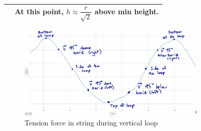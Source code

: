\documentclass[11pt, a4paper]{article}
\begin{document}
\begin{table}[H]
\begin{tabularx}{\textwidth}{|>{\raggedright\arraybackslash}X|||>{\raggedright\arraybackslash}X|}
			&
			At this point, $h\approx\dfrac{r}{\sqrt{2}}$ above min height.\\
			\hline
		\end{tabularx}
	\end{table}
	
	\begin{figure}[H]
		\centering
		\includegraphics[width=0.8\textwidth]{Images/Loop the loop graph with notes}
		\caption{Tension force in string during vertical loop}
	\end{figure}
	
\end{document}
